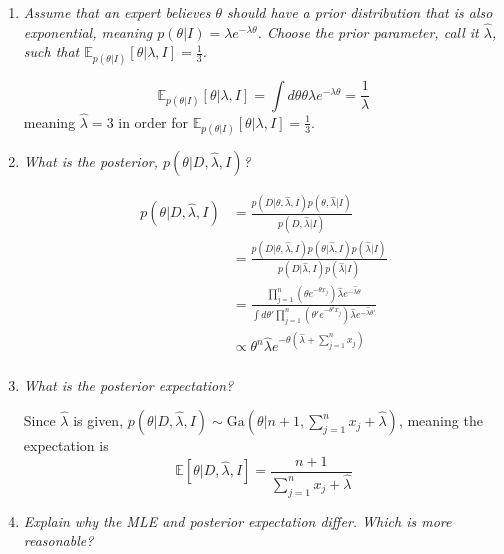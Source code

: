 \begin{example}
\begin{enumerate}
		\item \emph{Assume that an expert believes $\theta$ should have a prior distribution that is also exponential, meaning $p(\theta|I)=\lambda e^{-\lambda \theta}$. Choose the prior parameter, call it $\hat{\lambda}$, such that $\mathbb{E}_{p(\theta|I)}[\theta|\lambda,I]=\frac{1}{3}$.}
		
		\begin{equation}
			\mathbb{E}_{p(\theta|I)}[\theta|\lambda,I] = \int d\theta \theta\lambda e^{-\lambda \theta} = \frac{1}{\lambda}
		\end{equation}
		meaning $\hat{\lambda}=3$ in order for $\mathbb{E}_{p(\theta|I)}[\theta|\lambda,I] =\frac{1}{3}$.
		
		\item \emph{What is the posterior, $p(\theta|D,\hat{\lambda},I)$?}
		
		\begin{equation}
			\begin{split}
				p(\theta|D,\hat{\lambda},I) &= \frac{p(D|\theta,\hat{\lambda},I)p(\theta,\hat{\lambda}|I)}{p(D,\hat{\lambda}|I)}\\
				&= \frac{p(D|\theta,\hat{\lambda},I)p(\theta|\hat{\lambda},I)p(\hat{\lambda}|I)}{p(D|\hat{\lambda},I)p(\hat{\lambda}|I)}\\
				&= \frac{\prod_{j=1}^{n} (\theta e^{-\theta x_j})\hat{\lambda}e^{-\hat{\lambda}\theta}}{\int d\theta' \prod_{j=1}^{n} (\theta' e^{-\theta' x_j})\hat{\lambda}e^{-\hat{\lambda}\theta'}}\\
				&\propto \theta^n\hat{\lambda}e^{-\theta(\hat{\lambda}+\sum_{j=1}^nx_j)}\\
			\end{split}
		\end{equation}
		
		\item \emph{What is the posterior expectation?}\newline
		
		Since $\hat{\lambda}$ is given, $p(\theta|D,\hat{\lambda},I)\sim \text{Ga}(\theta|n+1,\sum_{j=1}^nx_j+\hat{\lambda})$, meaning the expectation is
		\begin{equation}
			\mathbb{E}[\theta|D,\hat{\lambda},I] = \frac{n+1}{\sum_{j=1}^nx_j+\hat{\lambda}} 
		\end{equation}
		
		\item \emph{Explain why the MLE and posterior expectation differ. Which is more reasonable?}\newline
		

\end{enumerate}
\end{example}
